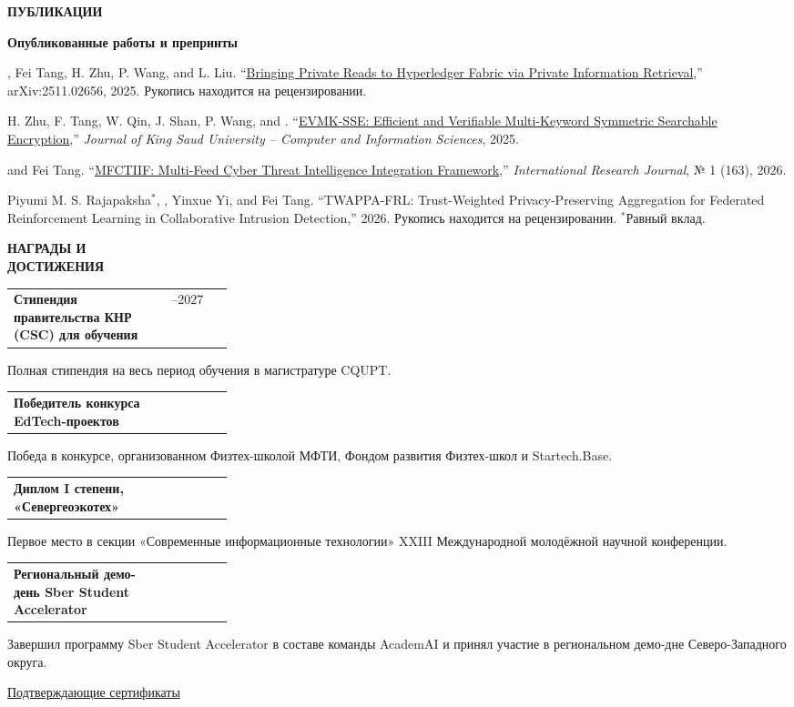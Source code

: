 \documentclass[11pt,a4paper]{article}
\makeatletter
\newcommand{\cvrow}[2]{%
  \noindent
  \begin{minipage}[t]{0.145\textwidth}
    \vspace{0pt}%
    \raggedright
    \fontsize{8.5}{10}\selectfont
    \bfseries\MakeUppercase{#1}
  \end{minipage}%
  \hfill
  \begin{minipage}[t]{0.835\textwidth}
    \vspace{0pt}%
    #2
  \end{minipage}\par
}
\newcommand{\entry}[2]{%
  \begin{tabularx}{\linewidth}{@{}X >{\raggedleft\arraybackslash}p{0.28\linewidth}@{}}
    #1 & #2
  \end{tabularx}
}
\newcommand{\pub}[2]{%
  #1 #2\par
  \vspace{0.28em}
}
\makeatother
\begin{document}
\vspace{0.75em}

\cvrow{Публикации}{%
  \textbf{Опубликованные работы и препринты}\par\vspace{0.25em}

  \pub{\underbar{Artur Iasenovets}, Fei Tang, H. Zhu, P. Wang, and L. Liu.}
  {``\href{https://arxiv.org/abs/2511.02656}
  {Bringing Private Reads to Hyperledger Fabric via Private Information Retrieval},''
  arXiv:2511.02656, 2025. Рукопись находится на рецензировании.}

  \pub{H. Zhu, F. Tang, W. Qin, J. Shan, P. Wang, and \underbar{Artur Iasenovets}.}
  {``\href{https://doi.org/10.1007/s44443-025-00405-8}
  {EVMK-SSE: Efficient and Verifiable Multi-Keyword Symmetric Searchable Encryption},''
  \textit{Journal of King Saud University -- Computer and Information Sciences}, 2025.}

  \pub{\underbar{Artur Iasenovets} and Fei Tang.}
  {``\href{https://doi.org/10.60797/IRJ.2026.163.57}
  {MFCTIIF: Multi-Feed Cyber Threat Intelligence Integration Framework},''
  \textit{International Research Journal}, № 1 (163), 2026.}

  \pub{Piyumi M. S. Rajapaksha$^{*}$, \underbar{Artur Iasenovets$^{*}$},
  Yinxue Yi, and Fei Tang.}
  {``TWAPPA-FRL: Trust-Weighted Privacy-Preserving Aggregation for Federated
  Reinforcement Learning in Collaborative Intrusion Detection,''
  2026. Рукопись находится на рецензировании. $^{*}$Равный вклад.}
}

\vspace{0.75em}

\cvrow{Награды и\\достижения}{%
  \entry
    {\textbf{Стипендия правительства КНР (CSC) для обучения}}
    {2024--2027}
  Полная стипендия на весь период обучения в магистратуре CQUPT.

  \vspace{0.45em}
  \entry
    {\textbf{Победитель конкурса EdTech-проектов}}
    {2023}
  Победа в конкурсе, организованном Физтех-школой МФТИ,
  Фондом развития Физтех-школ и Startech.Base.

  \vspace{0.45em}
  \entry
    {\textbf{Диплом I степени, «Севергеоэкотех»}}
    {2022}
  Первое место в секции «Современные информационные технологии»
  XXIII Международной молодёжной научной конференции.

  \vspace{0.45em}
  \entry
    {\textbf{Региональный демо-день Sber Student Accelerator}}
    {2023}
  Завершил программу Sber Student Accelerator в составе команды AcademAI
  и принял участие в региональном демо-дне Северо-Западного округа.

  \vspace{0.3em}
  \href{https://iasenovets.github.io/files/certificates_selected_en_public_ready_v2.pdf}
       {\small Подтверждающие сертификаты}
}
\end{document}
